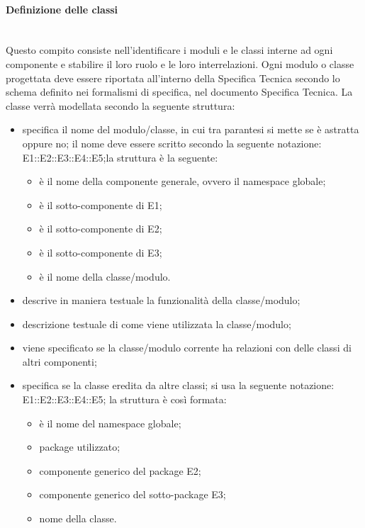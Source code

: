 \paragraph{Definizione delle classi} \hfill \\
Questo compito consiste nell'identificare i moduli e le classi interne ad ogni componente e stabilire il loro ruolo e le loro interrelazioni.
Ogni modulo o classe progettata deve essere riportata all'interno della Specifica Tecnica secondo lo schema definito nei formalismi di specifica, nel documento Specifica Tecnica. La classe verrà modellata secondo la seguente struttura:
\begin{itemize}
\item {}specifica il nome del  modulo/classe, in cui tra parantesi si mette se è astratta oppure no; il nome deve essere scritto secondo la seguente notazione: E1::E2::E3::E4::E5;la struttura è la seguente:
\begin{itemize}
\item {}è il nome della componente generale, ovvero il namespace globale;
\item {}è il sotto-componente di E1;
\item {}è il sotto-componente di E2;
\item {}è il sotto-componente di E3;
\item {}è il nome della classe/modulo.
\end{itemize}
\item {}descrive in maniera testuale la funzionalità della classe/modulo;
\item {}descrizione testuale di come viene utilizzata la classe/modulo;
\item {}viene specificato se la classe/modulo corrente ha relazioni con delle classi di altri componenti;
\item {}specifica se la classe eredita da altre classi; si usa la seguente notazione: E1::E2::E3::E4::E5; la struttura è così formata:
\begin{itemize}
\item {}è il nome del namespace globale;
\item {}package utilizzato;
\item {}componente generico del package E2;
\item {}componente generico del sotto-package E3;
\item {}nome della classe.
\end{itemize}
\end{itemize}

